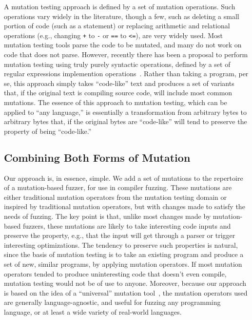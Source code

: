 A mutation testing approach is defined by a set of mutation operations.  Such operations vary widely in the literature, though a few, such as deleting a small portion of code (such as a statement) or replacing arithmetic and relational operations (e.g., changing {\tt +} to {\tt -} or {\tt ==} to {\tt <=}), are very widely used.  Most mutation testing tools parse the code to be mutated, and many do not work on code that does not parse.  However, recently there has been a proposal to perform mutation testing using truly purely syntactic operations, defined by a set of regular expressions implemention operations~\cite{regexpMut}.  Rather than taking a program, per se, this approach simply takes ``code-like'' text and produces a set of variants that, if the original text is compiling source code, will include most common mutations.  The essence of this approach to mutation testing, which can be applied to ``any language,'' is essentially a transformation from arbitrary bytes to arbitrary bytes that, if the original bytes are ``code-like'' will tend to preserve the property of being ``code-like.''


\subsection{Combining Both Forms of Mutation}

Our approach is, in essence, simple.  We add a set of mutations to the repertoire of a mutation-based fuzzer, for use in compiler fuzzing.  These mutations are either traditional mutation operators from the mutation testing domain or inspired by traditional mutation operators, but with changes made to satisfy the needs of fuzzing.  The key point is that, unlike most changes made by mutation-based fuzzers, these mutations are likely to take interesting code inputs and preserve the property, e.g., that the input will get through a parser or trigger interesting optimizations.  The tendency to preserve such properties is natural, since the basis of mutation testing is to take an existing program and produce a set of new, similar programs, by applying mutation operators.  If most mutation operators tended to produce uninteresting code that doesn't even compile, mutation testing would not be of use to anyone.  Moreover, because our approach is based on the idea of a ``universal'' mutation tool~\cite{regexpMut}, the mutation operators used are generally language-agnostic, and useful for fuzzing any programming language, or at least a wide variety of real-world languages.

